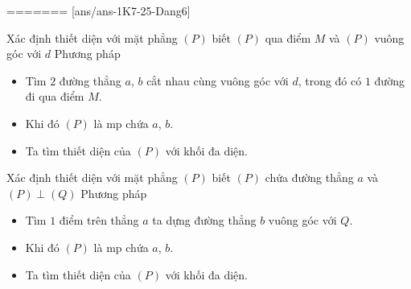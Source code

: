 =======
[ans/ans-1K7-25-Dang6]
\begin{dang}{Xác định thiết diện với mặt phẳng $(P)$ biết $(P)$ qua điểm  $M$ và $(P)$ vuông góc với $d$}
	Phương pháp
	\begin{itemize}
		\item Tìm $2$ đường thẳng  $a$, $b$ cắt nhau cùng vuông góc với $d$, trong đó có $1$ đường đi qua điểm $M$.
		\item Khi đó $(P)$ là mp chứa $a$, $b$.
		\item Ta tìm thiết diện của $(P)$ với khối đa diện.
	\end{itemize}
\end{dang}
\begin{dang}{ Xác định thiết diện với mặt phẳng  $(P)$ biết $(P)$ chứa đường thẳng $a$  và  $(P)\perp (Q)$}
	Phương pháp
	\begin{itemize}
		\item Tìm $1$ điểm trên thẳng  $a$ ta dựng đường thẳng $b$ vuông góc với $Q$.
		\item Khi đó $(P)$ là mp chứa $a$, $b$.
		\item Ta tìm thiết diện của $(P)$ với khối đa diện.
	\end{itemize}
\end{dang}
